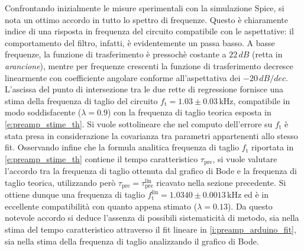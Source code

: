 \documentclass[a4paper,11pt]{article} %
\begin{document}
Confrontando inizialmente le misure sperimentali con la simulazione Spice, si nota un ottimo accordo in tutto lo spettro
di frequenze. Questo è chiaramente indice di una risposta in frequenza del circuito compatibile con le aspettative: il
comportamento del filtro, infatti, è evidentemente un passa basso. A basse frequenze, la funzione di trasferimento è
pressochè costante a $22\,\si{dB}$ (retta in \textit{arancione}), mentre per frequenze crescenti la funzione di
trasferimento decresce linearmente con coefficiente angolare conforme all'aspettativa dei $-20\,\si{dB/dec}$. L'ascissa
del punto di intersezione tra le due rette di regressione fornisce una stima della frequenza di taglio del circuito
$f_{\text{t}} = 1.03 \pm 0.03 \,\si{\kHz}$, compatibile in modo soddisfacente ($\lambda = 0.9$) con la frequenza di
taglio teorica esposta in \autoref{e:preamp_stime_th}. Si vuole sottolineare che nel computo dell'errore su
$f_{\text{t}}$ è stata presa in considerazione la covarianza tra parametri appartenenti allo stesso fit. Osservando
infine che la formula analitica frequenza di taglio $f_{\text{t}}$ riportata in \autoref{e:preamp_stime_th} contiene il
tempo caratteristico $\tau_{\text{pre}}$, si vuole valutare l'accordo tra la frequenza di taglio ottenuta dal grafico di
Bode e la frequenza di taglio teorica, utilizzando però $\tau_{\text{pre}}=\tau_{\text{pre}}^{\text{lin}}$ ricavato
nella sezione precedente. Si ottiene dunque una frequenza di taglio $f_{\text{t}}^{\text{lin}} = 1.0340 \pm 0.0013
\,\si{\kHz}$ ed è in eccellente compatibilità con quanto appena stimato ($\lambda = 0.13$). Da questo notevole accordo
si deduce l'assenza di possibili sistematicità di metodo, sia nella stima del tempo caratteristico attraverso il fit
lineare in \autoref{i:preamp_arduino_fit}, sia nella stima della frequenza di taglio analizzando il grafico di Bode. 


\end{document}
